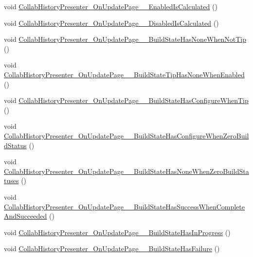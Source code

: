 \begin{DoxyCompactItemize}
\item 
void \mbox{\hyperlink{class_unity_editor_1_1_collaboration_1_1_tests_1_1_history_tests_a28afee10b3b3519e9156aadc0a9b94fa}{Collab\+History\+Presenter\+\_\+\+On\+Update\+Page\+\_\+\+\_\+\+Enabled\+Is\+Calculated}} ()
\item 
void \mbox{\hyperlink{class_unity_editor_1_1_collaboration_1_1_tests_1_1_history_tests_a7d0c691a2a4421abe00b45edae611386}{Collab\+History\+Presenter\+\_\+\+On\+Update\+Page\+\_\+\+\_\+\+Disabled\+Is\+Calculated}} ()
\item 
void \mbox{\hyperlink{class_unity_editor_1_1_collaboration_1_1_tests_1_1_history_tests_ab7e8472c3692f82e4c544b49e758a9ec}{Collab\+History\+Presenter\+\_\+\+On\+Update\+Page\+\_\+\+\_\+\+Build\+State\+Has\+None\+When\+Not\+Tip}} ()
\item 
void \mbox{\hyperlink{class_unity_editor_1_1_collaboration_1_1_tests_1_1_history_tests_ad1ebcb6a1f5391ae8e3fa9a206d6bd97}{Collab\+History\+Presenter\+\_\+\+On\+Update\+Page\+\_\+\+\_\+\+Build\+State\+Tip\+Has\+None\+When\+Enabled}} ()
\item 
void \mbox{\hyperlink{class_unity_editor_1_1_collaboration_1_1_tests_1_1_history_tests_aaa14bb16d5257c0e68545c49c0826539}{Collab\+History\+Presenter\+\_\+\+On\+Update\+Page\+\_\+\+\_\+\+Build\+State\+Has\+Configure\+When\+Tip}} ()
\item 
void \mbox{\hyperlink{class_unity_editor_1_1_collaboration_1_1_tests_1_1_history_tests_a0e8df3560b912f6a69d8b1dce0671883}{Collab\+History\+Presenter\+\_\+\+On\+Update\+Page\+\_\+\+\_\+\+Build\+State\+Has\+Configure\+When\+Zero\+Build\+Status}} ()
\item 
void \mbox{\hyperlink{class_unity_editor_1_1_collaboration_1_1_tests_1_1_history_tests_ab874167ade8dbc26bf48b9cd3a4546e8}{Collab\+History\+Presenter\+\_\+\+On\+Update\+Page\+\_\+\+\_\+\+Build\+State\+Has\+None\+When\+Zero\+Build\+Statuses}} ()
\item 
void \mbox{\hyperlink{class_unity_editor_1_1_collaboration_1_1_tests_1_1_history_tests_a061f2e223e6ff15ed665767bdc05817e}{Collab\+History\+Presenter\+\_\+\+On\+Update\+Page\+\_\+\+\_\+\+Build\+State\+Has\+Success\+When\+Complete\+And\+Succeeded}} ()
\item 
void \mbox{\hyperlink{class_unity_editor_1_1_collaboration_1_1_tests_1_1_history_tests_aa6beb053787c9034823cb64dcf03f9a3}{Collab\+History\+Presenter\+\_\+\+On\+Update\+Page\+\_\+\+\_\+\+Build\+State\+Has\+In\+Progress}} ()
\item 
void \mbox{\hyperlink{class_unity_editor_1_1_collaboration_1_1_tests_1_1_history_tests_a92edbd08d5b31d83f2ddf483ce8e219b}{Collab\+History\+Presenter\+\_\+\+On\+Update\+Page\+\_\+\+\_\+\+Build\+State\+Has\+Failure}} ()

\end{DoxyCompactItemize}
